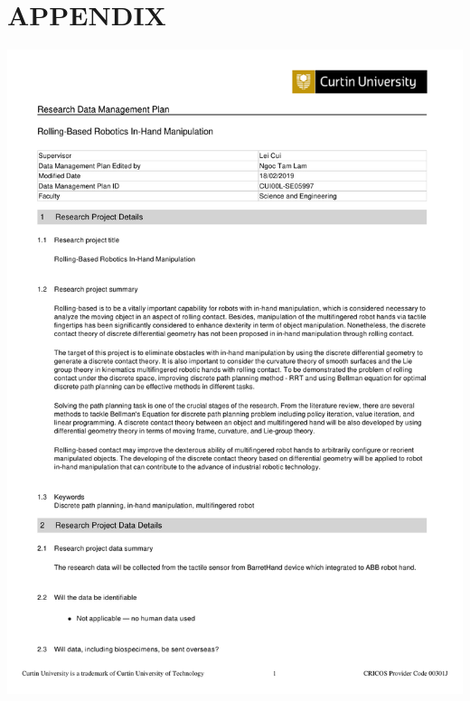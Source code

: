 \documentclass{article}
\begin{document}
\cleardoublepage
\appendix
\section{APPENDIX}
\label{appendix:A}

\centering
\includegraphics[scale=0.8]{DataManagement.pdf}

\end{document}
